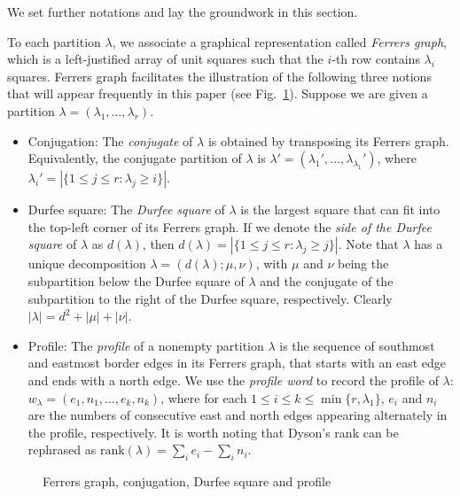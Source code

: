 \documentclass[12pt,reqno]{amsart}
\numberwithin{equation}{section}
\theoremstyle{plain}
\theoremstyle{definition}
\begin{document}
We set further notations and lay the groundwork in this section.

To each partition $\lambda$, we associate a graphical representation called {\em Ferrers graph}, which is a
left-justified array of unit squares such that the $i$-th row contains $\lambda_i$ squares. Ferrers graph
facilitates the illustration of the following three notions that will appear frequently in this paper (see
Fig.~\ref{ferrers}). Suppose we are given a partition $\lambda=(\lambda_1,\ldots,\lambda_r)$.
\begin{itemize}
\item Conjugation: The {\em conjugate} of $\lambda$ is obtained by transposing its Ferrers graph.
Equivalently, the conjugate partition of $\lambda$ is $\lambda'=(\lambda_1',\ldots,\lambda_{\lambda_1}')$,
where $\lambda_i'=|\{1\le j\le r:\lambda_j\ge i\}|$.

\item Durfee square: The {\em Durfee square} of $\lambda$ is the largest square that can fit into the
top-left corner of its Ferrers graph. If we denote the {\em side of the Durfee square} of $\lambda$ as
$d(\lambda)$, then $d(\lambda)=|\{1\le j\le r:\lambda_j\ge j\}|$. Note that $\lambda$ has a unique
decomposition $\lambda=(d(\lambda);\mu,\nu)$, with $\mu$ and $\nu$ being the subpartition below the Durfee
square of $\lambda$ and the conjugate of the subpartition to the right of the Durfee square, respectively.
Clearly $|\lambda|=d^2+|\mu|+|\nu|$.

\item Profile: The {\em profile} of a nonempty partition $\lambda$ is the sequence of southmost and
eastmost border edges in its Ferrers graph, that starts with an east edge and ends with a north edge. We
use the {\em profile word} to record the profile of $\lambda$: $w_{\lambda}=(e_1,n_1,\ldots,e_k,n_k)$,
where for each $1\le i\le k\le \min\{r,\lambda_1\}$, $e_i$ and $n_i$ are the numbers of consecutive east
and north edges appearing alternately in the profile, respectively. It is worth noting that Dyson's rank
can be rephrased as $\textrm{rank}(\lambda)=\sum_i e_i-\sum_i n_i$.
\end{itemize}

\begin{figure}[htp]
\begin{ferrers}
\end{ferrers}
\caption{Ferrers graph, conjugation, Durfee square and profile}
\label{ferrers}
\end{figure}
\end{document}
